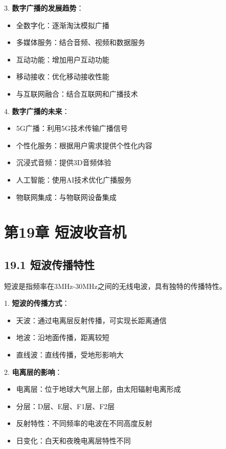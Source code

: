 \documentclass[12pt,UTF8]{ctexbook}
\begin{document}
3. \textbf{数字广播的发展趋势}：
   \begin{itemize}[leftmargin=3.5em]
   \item 全数字化：逐渐淘汰模拟广播
   \item 多媒体服务：结合音频、视频和数据服务
   \item 互动功能：增加用户互动功能
   \item 移动接收：优化移动接收性能
   \item 与互联网融合：结合互联网和广播技术
   \end{itemize}

4. \textbf{数字广播的未来}：
   \begin{itemize}[leftmargin=3.5em]
   \item 5G广播：利用5G技术传输广播信号
   \item 个性化服务：根据用户需求提供个性化内容
   \item 沉浸式音频：提供3D音频体验
   \item 人工智能：使用AI技术优化广播服务
   \item 物联网集成：与物联网设备集成
   \end{itemize}

\chapter*{第19章 短波收音机}
\section*{19.1 短波传播特性}

短波是指频率在3MHz-30MHz之间的无线电波，具有独特的传播特性。

1. \textbf{短波的传播方式}：
   \begin{itemize}[leftmargin=3.5em]
   \item 天波：通过电离层反射传播，可实现长距离通信
   \item 地波：沿地面传播，距离较短
   \item 直线波：直线传播，受地形影响大
   \end{itemize}

2. \textbf{电离层的影响}：
   \begin{itemize}[leftmargin=3.5em]
   \item 电离层：位于地球大气层上部，由太阳辐射电离形成
   \item 分层：D层、E层、F1层、F2层
   \item 反射特性：不同频率的电波在不同高度反射
   \item 日变化：白天和夜晚电离层特性不同
   \end{itemize}
\end{document}
